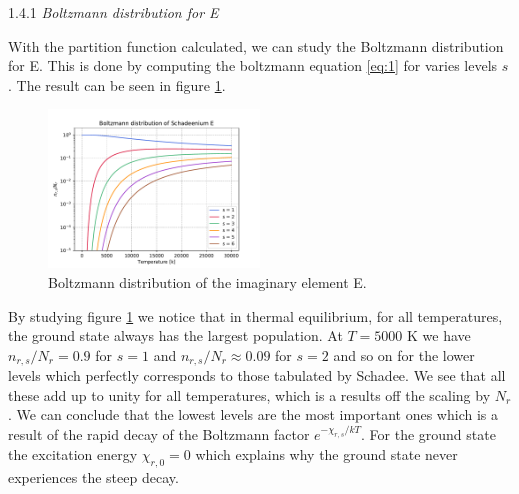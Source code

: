 \documentclass[a4paper,11.5pt,]{article}
\begin{document}
\begin{multicols}{2}
\begin{center}
1.4.1 \textit{ Boltzmann distribution for E}
\end{center}
With the partition function calculated, we can study the Boltzmann distribution for E. This is done by computing the boltzmann equation \eqref{eq:1} for varies levels $s$. The result can be seen in figure \ref{fig:2}.

\begin{figure}[H]
	\centering
	\includegraphics[width=0.5\textwidth]{figures/boltz_E.pdf}
	\caption{Boltzmann distribution of the imaginary element E.}
	\label{fig:2}
\end{figure}



\noindent By studying figure \ref{fig:2} we notice that in thermal equilibrium, for all temperatures, the ground state always has the largest population. At $T = 5000$ K we have $n_{r,s}/N_r = 0.9$ for $s = 1$ and $n_{r,s}/N_r \approx 0.09$ for $s=2$ and so on for the lower levels which perfectly corresponds to those tabulated by Schadee. We see that all these add up to unity for all temperatures, which is a results off the scaling by $N_r$. We can conclude that the lowest levels are the most important ones which is a result of the rapid decay of the Boltzmann factor $e^{-\chi_{r,s}/kT}$. For the ground state the excitation energy $\chi_{r,0} = 0$ which explains why the ground state never experiences the steep decay. 


\end{multicols}
\end{document}
